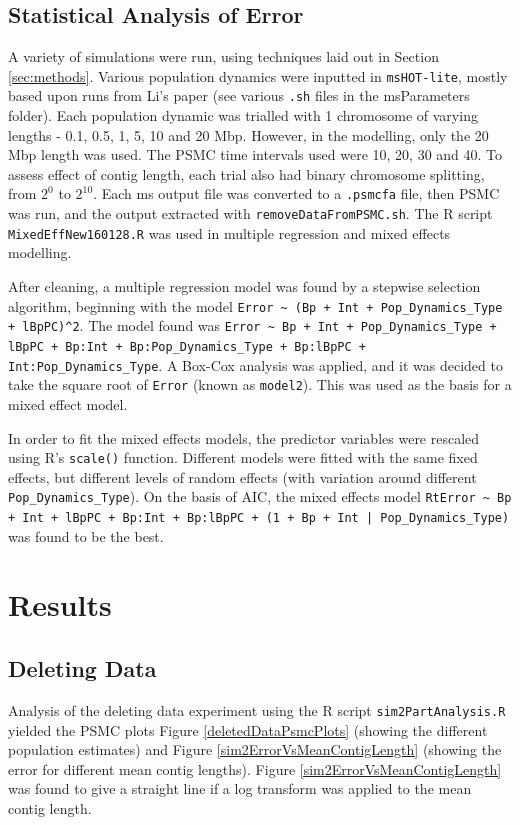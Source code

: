 \documentclass[11pt,a4paper]{article}
\begin{document}
\subsection{Statistical Analysis of Error}
A variety of simulations were run, using techniques laid out in Section \ref{sec:methods}. Various population dynamics were inputted in \verb|msHOT-lite|, mostly based upon runs from Li's paper \cite{li2011inference} (see various \verb|.sh| files in the msParameters folder). Each population dynamic was trialled with 1 chromosome of varying lengths - 0.1, 0.5, 1, 5, 10 and 20 Mbp. However, in the modelling, only the 20 Mbp length was used. The PSMC time intervals used were 10, 20, 30 and 40. To assess effect of contig length, each trial also had binary chromosome splitting, from $2^0$ to $2^{10}$. Each ms output file was converted to a \verb|.psmcfa| file, then PSMC was run, and the output extracted with \verb|removeDataFromPSMC.sh|. The R script \verb|MixedEffNew160128.R| was used in multiple regression and mixed effects modelling.

After cleaning, a multiple regression model was found by a stepwise selection algorithm, beginning with the model \verb|Error ~ (Bp + Int + Pop_Dynamics_Type + lBpPC)^2|. The model found was \verb|Error ~ Bp + Int + Pop_Dynamics_Type + lBpPC + Bp:Int + Bp:Pop_Dynamics_Type + Bp:lBpPC + Int:Pop_Dynamics_Type|. A Box-Cox analysis was applied, and it was decided to take the square root of \verb|Error| (known as \verb|model2|). This was used as the basis for a mixed effect model.

In order to fit the mixed effects models, the predictor variables were rescaled using R's \verb|scale()| function. Different models were fitted with the same fixed effects, but different levels of random effects (with variation around different \verb|Pop_Dynamics_Type|). On the basis of AIC, the mixed effects model \verb;RtError ~ Bp + Int + lBpPC + Bp:Int + Bp:lBpPC + (1 + Bp + Int | Pop_Dynamics_Type); was found to be the best.



\section{Results}

\subsection{Deleting Data}
Analysis of the deleting data experiment using the R script \verb|sim2PartAnalysis.R| yielded the PSMC plots Figure \ref{deletedDataPsmcPlots} (showing the different population estimates) and Figure \ref{sim2ErrorVsMeanContigLength} (showing the error for different mean contig lengths). Figure \ref{sim2ErrorVsMeanContigLength} was found to give a straight line if a log transform was applied to the mean contig length.
\end{document}
